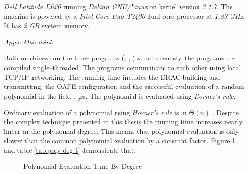 \label{sec:evaluation}

\label{sec:test-setup}

\label{sec:test-machines}


\emph{Dell Latitude D620} running \emph{Debian GNU/Linux} on kernel version
\emph{3.1.7}. The machine is powered by a \emph{Intel\TReg{} Core Duo T2400}
dual core processor at \emph{1.83 GHz}. It has \emph{2 GB} system memory.



\emph{Apple Mac mini}.


Both machines run the three programs (\JWBpOne{}, \JWBpTwo{}, \JWBtoken{})
simultaneously, the programs are compiled single--threaded. The programs
communicate to each other using local TCP/IP networking. The running time
includes the DRAC building and transmitting, the OAFE configuration and the
successful evaluation of a random polynomial in the field
$\mathbb{F}_{2^{256}}$.  The polynomial is evaluated using \emph{Horner's rule}.


\label{sec:running-time}

Ordinary evaluation of a polynomial using \emph{Horner's rule} is in $\Theta(n)$
\cite{cormen01}. Despite the complex technique presented in this thesis the
running time increases nearly linear in the polynomial degree. This means that
polynomial evaluation is only slower than the common polynomial evaluation by a
constant factor. Figure \ref{fig:poly-deg-t} and table \ref{tab:poly-deg-t}
demonstrate that.

\begin{figure}[ht]
  \centering
  
  \caption{Polynomial Evaluation Time By Degree}
  \label{fig:poly-deg-t}
\end{figure}

